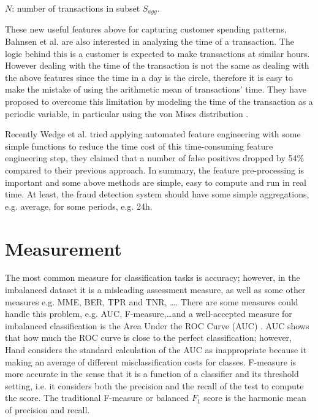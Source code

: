 $N$: number of transactions in subset $S_{agg}$.

These new useful features above for capturing customer spending patterns, Bahnsen et al. \cite{bahnsen2016feature} are also interested in analyzing the time of a transaction. The logic behind this is a customer is expected to make transactions at similar hours. However dealing with the time of the transaction is not the same as dealing with the above features since the time in a day is the circle, therefore it is easy to make the mistake of using the arithmetic mean of transactions' time. They have proposed to overcome this limitation by modeling the time of the transaction as a periodic variable, in particular using the von Mises distribution \citep{fisher1995statistical}.

Recently Wedge et al. \citep{wedge2017solving} tried applying automated feature engineering with some simple functions to reduce the time cost of this time-consuming feature engineering step, they claimed that a number of false positives dropped by 54\% compared to their previous approach. In summary, the feature pre-processing is important and some above methods are simple, easy to compute and run in real time. At least, the fraud detection system should have some simple aggregations, e.g. average, for some periods, e.g. 24h.


\section{Measurement}
\label{measurement}

The most common measure for classification tasks is accuracy; however, in the imbalanced dataset it is a misleading assessment measure, as well as some other measures e.g. MME, BER, TPR and TNR, \dots. There are some measures could handle this problem, e.g. AUC, F-measure,\dots and a well-accepted measure for imbalanced classification is the Area Under the ROC Curve (AUC) \citep{chawla2009data}. AUC shows that how much the ROC curve is close to the perfect classification; however, Hand \citep{hand2009measuring} considers the standard calculation of the AUC as inappropriate because it making an average of different misclassification costs for classes. F-measure is more accurate in the sense that it is a function of a classifier and its threshold setting, i.e. it considers both the precision and the recall of the test to compute the score. The traditional F-measure or balanced $F_1$ score is the harmonic mean of precision and recall.

